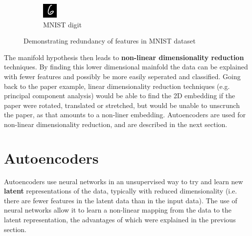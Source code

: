 \documentclass[12pt,a4paper,twoside,openright]{report}
\begin{document}
\begin{figure}[H]
\begin{subfigure}[b]{0.4\linewidth}
    \includegraphics[width=\linewidth,scale=1]{figs/digit.png}
    \caption{MNIST digit}
  \end{subfigure}
  \caption{Demonstrating redundancy of features in MNIST dataset}
  \label{fig:digit}
\end{figure}

The manifold hypothesis then leads to \textbf{non-linear dimensionality reduction} techniques. By finding this lower dimensional
mainfold the data can be explained with fewer features and possibly be more easily seperated and classified. Going back to the paper example,
linear dimensionality reduction techniques (e.g. principal component analysis) would be able to find the 2D embedding if the paper were 
rotated, translated or stretched, but would be unable to unscrunch the paper, as that amounts to a non-liner embedding. Autoencoders are 
used for non-linear dimensionality reduction, and are described in the next section.

\section{Autoencoders}

Autoencoders use neural networks in an unsupervised way to try and learn new \textbf{latent} representations of the data, typically with reduced 
dimensionality (i.e. there are fewer features in the latent data than in the input data). The use of neural networks allow it to learn a 
non-linear mapping from the data to the latent representation, the advantages of which were explained in the previous section.
\end{document}
